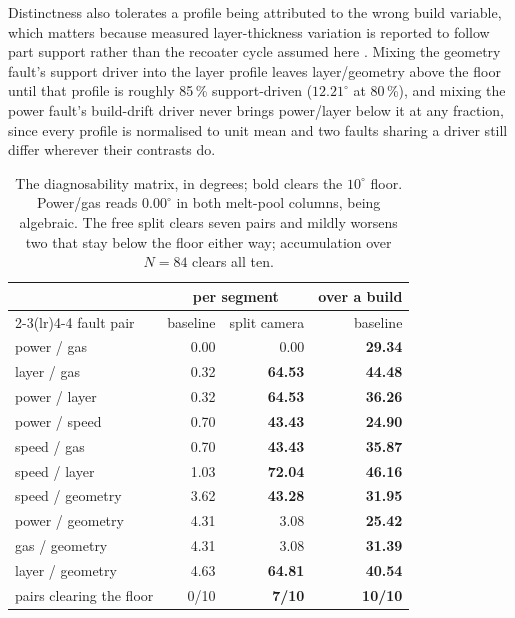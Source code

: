 \documentclass[preprint,times]{elsarticle}
\begin{document}
Distinctness also tolerates a profile being attributed to the wrong build
variable, which matters because measured layer-thickness variation is reported
to follow part support rather than the recoater cycle assumed here
\cite{Liu2022}. Mixing the geometry fault's support driver into the layer
profile leaves layer/geometry above the floor until that profile is roughly
85\,\% support-driven ($12.21^\circ$ at 80\,\%), and mixing the power fault's
build-drift driver never brings power/layer below it at any fraction, since
every profile is normalised to unit mean and two faults sharing a driver still
differ wherever their contrasts do.

\begin{table}[htbp]
\centering
\caption{The diagnosability matrix, in degrees; bold clears the $10^\circ$ floor.
Power/gas reads $0.00^\circ$ in both melt-pool columns, being algebraic. The free
split clears seven pairs and mildly worsens two that stay below the floor either
way; accumulation over $N=84$ clears all ten.}
\label{tab:matrix}
\scriptsize
\begin{tabular}{@{}lrrr@{}}
\toprule
 & \multicolumn{2}{c}{per segment} & over a build \\
\cmidrule(lr){2-3}\cmidrule(lr){4-4}
fault pair & baseline & split camera & baseline \\
\midrule
power / gas      & 0.00 & 0.00 & \textbf{29.34} \\
layer / gas      & 0.32 & \textbf{64.53} & \textbf{44.48} \\
power / layer    & 0.32 & \textbf{64.53} & \textbf{36.26} \\
power / speed    & 0.70 & \textbf{43.43} & \textbf{24.90} \\
speed / gas      & 0.70 & \textbf{43.43} & \textbf{35.87} \\
speed / layer    & 1.03 & \textbf{72.04} & \textbf{46.16} \\
speed / geometry & 3.62 & \textbf{43.28} & \textbf{31.95} \\
power / geometry & 4.31 & 3.08 & \textbf{25.42} \\
gas / geometry   & 4.31 & 3.08 & \textbf{31.39} \\
layer / geometry & 4.63 & \textbf{64.81} & \textbf{40.54} \\
\midrule
pairs clearing the floor & 0/10 & \textbf{7/10} & \textbf{10/10} \\
\bottomrule
\end{tabular}
\end{table}
\end{document}
